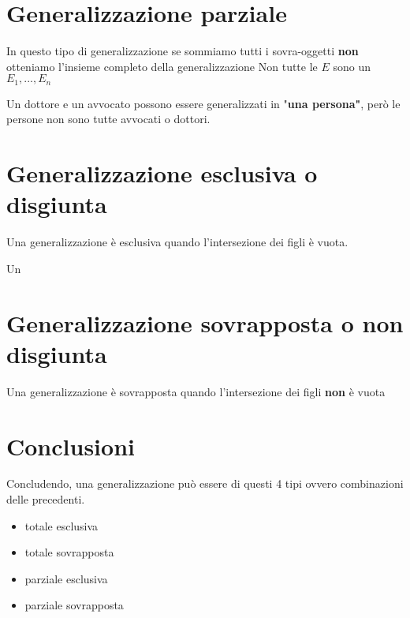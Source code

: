 \section{Generalizzazione parziale}

In questo tipo di generalizzazione se sommiamo tutti i sovra-oggetti \textbf{non} otteniamo l'insieme completo della generalizzazione
Non tutte le $E$ sono un $E_1, ..., E_n$

\begin{exmp}
Un dottore e un avvocato possono essere generalizzati in "\textbf{una persona"}, però le persone non sono tutte avvocati o dottori.
\end{exmp}

\section{Generalizzazione esclusiva o disgiunta}

Una generalizzazione è esclusiva quando l'intersezione dei figli è vuota.

\begin{exmp}
Un 
\end{exmp}

\section{Generalizzazione sovrapposta o non disgiunta}

Una generalizzazione è sovrapposta quando l'intersezione dei figli \textbf{non} è vuota

\section{Conclusioni}

Concludendo, una generalizzazione può essere di questi 4 tipi ovvero combinazioni delle precedenti.

\begin{itemize}
    \item totale esclusiva
    \item totale sovrapposta
    \item parziale esclusiva
    \item parziale sovrapposta
\end{itemize}